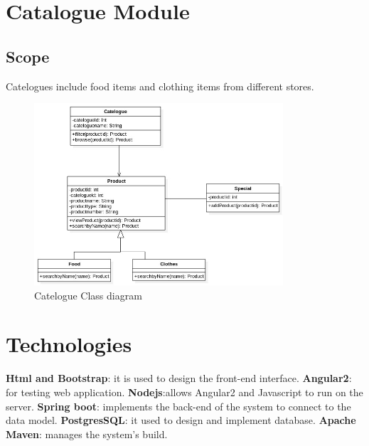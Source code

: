 \documentclass[12pt,a4paper]{article}
\begin{document}
\section{Catalogue Module}	
\subsection{Scope}
Catelogues include food items and clothing items from different stores.\newpage
\begin{figure}[!ht]
\includegraphics[width=350px]{Diagrams/catelogueclassdiagram.jpg}
\caption{Catelogue Class diagram}
\end{figure}


\section{Technologies}	
\textbf{Html and Bootstrap}: it is used to design the front-end interface.\newline
\textbf{Angular2}: for testing web application. \newline
\textbf{Nodejs}:allows Angular2 and Javascript to run on the server.\newline
\textbf{Spring boot}: implements the back-end of the system to connect to the data model.\newline
\textbf{PostgresSQL}: it used to design and implement database. \newline
\textbf{Apache Maven}: manages the system's build.
\end{document}
